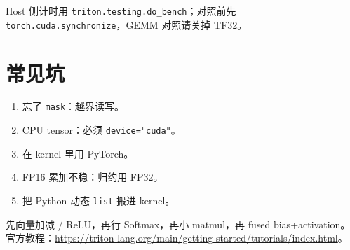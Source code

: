 Host 侧计时用 \texttt{triton.testing.do\_bench}；对照前先 \texttt{torch.cuda.synchronize}，GEMM 对照请关掉 TF32。

\section{常见坑}

\begin{enumerate}
  \item 忘了 \texttt{mask}：越界读写。
  \item CPU tensor：必须 \texttt{device="cuda"}。
  \item 在 kernel 里用 PyTorch。
  \item FP16 累加不稳：归约用 FP32。
  \item 把 Python 动态 \texttt{list} 搬进 kernel。
\end{enumerate}

\begin{exercise}[建议顺序]
先向量加减 / ReLU，再行 Softmax，再小 matmul，再 fused bias+activation。官方教程：\url{https://triton-lang.org/main/getting-started/tutorials/index.html}。
\end{exercise}
